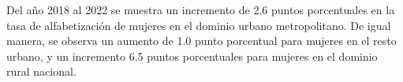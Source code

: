 Del año 2018 al 2022 se muestra un incremento de 2.6 puntos porcentuales en la tasa de alfabetización de mujeres en el dominio urbano metropolitano. De igual manera, se observa un aumento de 1.0 punto porcentual para mujeres en el resto urbano, y un incremento 6.5 puntos porcentuales para mujeres en el dominio rural nacional. 